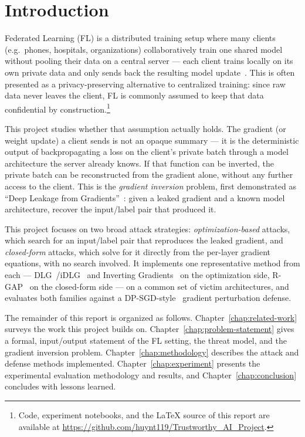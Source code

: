 \chapter{Introduction}
\label{chap:introduction}

Federated Learning (FL) is a distributed training setup where many clients
(e.g.\ phones, hospitals, organizations) collaboratively train one shared
model without pooling their data on a central server --- each client trains
locally on its own private data and only sends back the resulting model
update~\cite{mcmahan2017fedavg}. This is often presented as a
privacy-preserving alternative to centralized training: since raw data
never leaves the client, FL is commonly assumed to keep that data
confidential by construction.\footnote{Code, experiment notebooks, and the
\LaTeX{} source of this report are available at
\url{https://github.com/huynt119/Trustworthy_AI_Project}.}

This project studies whether that assumption actually holds. The gradient
(or weight update) a client sends is not an opaque summary --- it is the
deterministic output of backpropagating a loss on the client's private
batch through a model architecture the server already knows. If that
function can be inverted, the private batch can be reconstructed from the
gradient alone, without any further access to the client. This is the
\emph{gradient inversion} problem, first demonstrated as ``Deep Leakage
from Gradients''~\cite{zhu2019dlg}: given a leaked gradient and a known
model architecture, recover the input/label pair that produced it.

This project focuses on two broad attack strategies: \emph{optimization-based}
attacks, which search for an input/label pair that reproduces the leaked
gradient, and \emph{closed-form} attacks, which solve for it directly from
the per-layer gradient equations, with no search involved. It implements
one representative method from each --- DLG~\cite{zhu2019dlg}/iDLG~\cite{zhao2020idlg}
and Inverting Gradients~\cite{geiping2020inverting} on the optimization
side, R-GAP~\cite{zhu2021rgap} on the closed-form side --- on a common set of
victim architectures, and evaluates both families against a
DP-SGD-style~\cite{abadi2016dpsgd} gradient perturbation defense.

The remainder of this report is organized as follows. Chapter~\ref{chap:related-work}
surveys the work this project builds on. Chapter~\ref{chap:problem-statement}
gives a formal, input/output statement of the FL setting, the threat model,
and the gradient inversion problem. Chapter~\ref{chap:methodology} describes
the attack and defense methods implemented. Chapter~\ref{chap:experiment}
presents the experimental evaluation methodology and results, and
Chapter~\ref{chap:conclusion} concludes with lessons learned.
